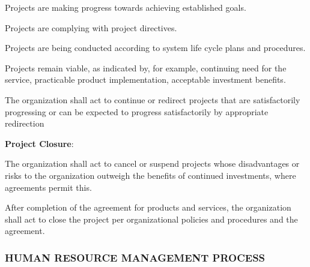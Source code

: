 \begin{adjustwidth}{2em}{0pt}
\begin{compactenum}
\begin{compactenum}
						\begin{compactenum}

							\item Projects are making progress towards achieving established goals.

							\item Projects are complying with project directives.

							\item Projects are being conducted according to system life cycle plans and procedures.

							\item Projects remain viable, as indicated by, for example, continuing need for the service, practicable product implementation, acceptable investment benefits.

						\end{compactenum}

						\item The organization shall act to continue or redirect projects that are satisfactorily progressing or can be expected to progress satisfactorily by appropriate redirection

					\end{compactenum}


					\item {\bf Project Closure}:

					\begin{compactenum}

						\item The organization shall act to cancel or suspend projects whose disadvantages or risks to the organization outweigh the benefits of continued investments, where agreements permit this.

						\item After completion of the agreement for products and services, the organization shall act to close the project per organizational policies and procedures and the agreement.

					\end{compactenum}

				\end{compactenum}

			\end{adjustwidth}

		\newpage
		\subsubsection{HUMAN RESOURCE MANAGEMENT PROCESS\label{proc:human_resource_management_process}}

